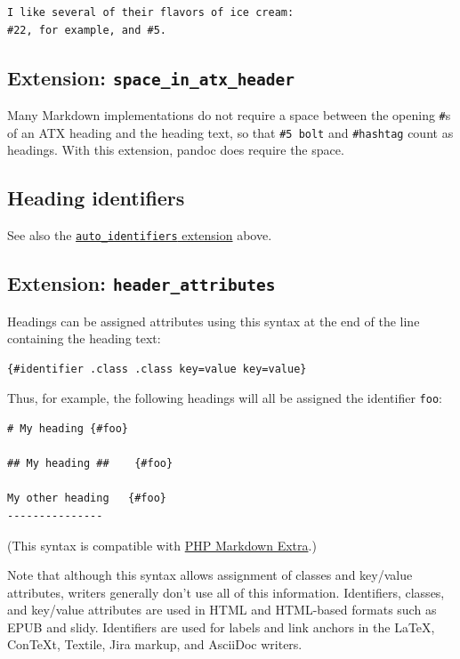 \documentclass[
  b5paper
]{book}
\begin{document}
\begin{verbatim}
I like several of their flavors of ice cream:
#22, for example, and #5.
\end{verbatim}

\subsection{\texorpdfstring{Extension:
\texttt{space\_in\_atx\_header}}{Extension: space\_in\_atx\_header}}\label{extension-space_in_atx_header}

Many Markdown implementations do not require a space between the opening
\texttt{\#}s of an ATX heading and the heading text, so that
\texttt{\#5\ bolt} and \texttt{\#hashtag} count as headings. With this
extension, pandoc does require the space.

\subsection{Heading identifiers}\label{heading-identifiers}

See also the
\hyperref[extension-auto_identifiers]{\texttt{auto\_identifiers}
extension} above.

\subsection{\texorpdfstring{Extension:
\texttt{header\_attributes}}{Extension: header\_attributes}}\label{extension-header_attributes}

Headings can be assigned attributes using this syntax at the end of the
line containing the heading text:

\begin{verbatim}
{#identifier .class .class key=value key=value}
\end{verbatim}

Thus, for example, the following headings will all be assigned the
identifier \texttt{foo}:

\begin{verbatim}
# My heading {#foo}

## My heading ##    {#foo}

My other heading   {#foo}
---------------
\end{verbatim}

(This syntax is compatible with
\href{https://michelf.ca/projects/php-markdown/extra/}{PHP Markdown
Extra}.)

Note that although this syntax allows assignment of classes and
key/value attributes, writers generally don't use all of this
information. Identifiers, classes, and key/value attributes are used in
HTML and HTML-based formats such as EPUB and slidy. Identifiers are used
for labels and link anchors in the LaTeX, ConTeXt, Textile, Jira markup,
and AsciiDoc writers.
\end{document}

